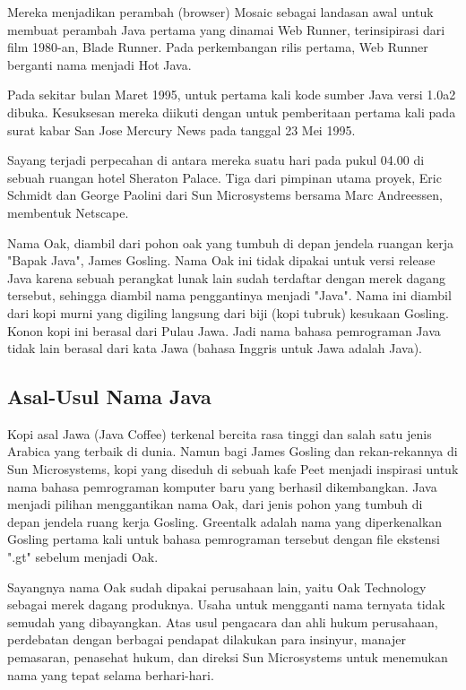 Mereka menjadikan perambah (browser) Mosaic sebagai landasan awal untuk membuat perambah Java pertama yang dinamai Web Runner, terinsipirasi dari film 1980-an, Blade Runner. Pada perkembangan rilis pertama, Web Runner berganti nama menjadi Hot Java.

Pada sekitar bulan Maret 1995, untuk pertama kali kode sumber Java versi 1.0a2 dibuka. Kesuksesan mereka diikuti dengan untuk pemberitaan pertama kali pada surat kabar San Jose Mercury News pada tanggal 23 Mei 1995.

Sayang terjadi perpecahan di antara mereka suatu hari pada pukul 04.00 di sebuah ruangan hotel Sheraton Palace. Tiga dari pimpinan utama proyek, Eric Schmidt dan George Paolini dari Sun Microsystems bersama Marc Andreessen, membentuk Netscape.

Nama Oak, diambil dari pohon oak yang tumbuh di depan jendela ruangan kerja "Bapak Java", James Gosling. Nama Oak ini tidak dipakai untuk versi release Java karena sebuah perangkat lunak lain sudah terdaftar dengan merek dagang tersebut, sehingga diambil nama penggantinya menjadi "Java". Nama ini diambil dari kopi murni yang digiling langsung dari biji (kopi tubruk) kesukaan Gosling. Konon kopi ini berasal dari Pulau Jawa. Jadi nama bahasa pemrograman Java tidak lain berasal dari kata Jawa (bahasa Inggris untuk Jawa adalah Java).

\subsection{Asal-Usul Nama Java}
Kopi asal Jawa (Java Coffee) terkenal bercita rasa tinggi dan salah satu jenis Arabica yang terbaik di dunia. Namun bagi James Gosling dan rekan-rekannya di Sun Microsystems, kopi yang diseduh di sebuah kafe Peet menjadi inspirasi untuk nama bahasa pemrograman komputer baru yang berhasil dikembangkan. Java menjadi pilihan menggantikan nama Oak, dari jenis pohon yang tumbuh di depan jendela ruang kerja Gosling. Greentalk adalah nama yang diperkenalkan Gosling pertama kali untuk bahasa pemrograman tersebut dengan file ekstensi ".gt" sebelum menjadi Oak.

Sayangnya nama Oak sudah dipakai perusahaan lain, yaitu Oak Technology sebagai merek dagang produknya. Usaha untuk mengganti nama ternyata tidak semudah yang dibayangkan. Atas usul pengacara dan ahli hukum perusahaan, perdebatan dengan berbagai pendapat dilakukan para insinyur, manajer pemasaran, penasehat hukum, dan direksi Sun Microsystems untuk menemukan nama yang tepat selama berhari-hari.

